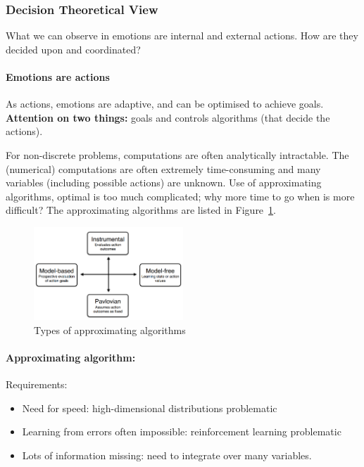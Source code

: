 \documentclass[12pt,article,oneside,a4paper]{memoir}
\begin{document}
\subsubsection{Decision Theoretical View}
What we can observe in emotions are internal and external actions. How are they
decided upon and coordinated?

\paragraph{Emotions are actions}
As actions, emotions are adaptive, and can be optimised to achieve goals.
\textbf{Attention on two things:} goals and controls algorithms (that decide
the actions).

For non-discrete problems, computations are often analytically intractable. The
(numerical) computations are often extremely time-consuming and many variables
(including possible actions) are unknown. Use of approximating algorithms,
optimal is too much complicated; why more time to go when is more difficult?
The approximating algorithms are listed in
Figure~\ref{fig:approximating-algorithms}.

\begin{figure}
  \centering
  \includegraphics[width=0.5\textwidth]{imgs/approximating-algorithms.png}
  \caption{Types of approximating algorithms}
  \label{fig:approximating-algorithms}
\end{figure}

\paragraph{Approximating algorithm:} 
Requirements: 
\begin{itemize}
\item Need for speed: high-dimensional distributions problematic
\item Learning from errors often impossible: reinforcement learning problematic
\item Lots of information missing: need to integrate over many variables.
\end{itemize}
\end{document}

